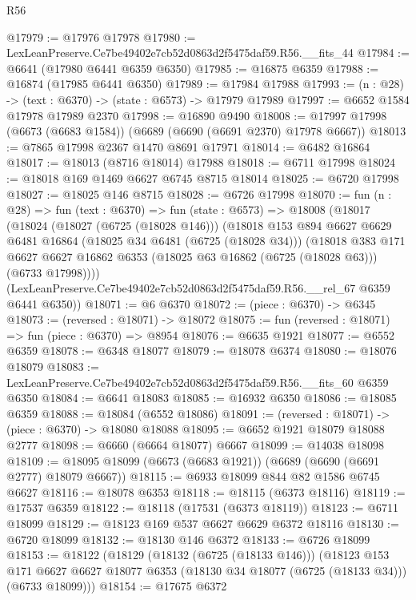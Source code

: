 \begin{lexlean}{R56}
\begin{coremodule}
@17979 := @17976 @17978
@17980 := LexLeanPreserve.Ce7be49402e7cb52d0863d2f5475daf59.R56.__fits_44
@17984 := @6641 (@17980 @6441 @6359 @6350)
@17985 := @16875 @6359
@17988 := @16874 (@17985 @6441 @6350)
@17989 := @17984 @17988
@17993 := (n : @28) -> (text : @6370) -> (state : @6573) -> @17979 @17989
@17997 := @6652 @1584 @17978 @17989 @2370
@17998 := @16890 @9490
@18008 := @17997 @17998 (@6673 (@6683 @1584)) (@6689 (@6690 (@6691 @2370) @17978 @6667))
@18013 := @7865 @17998 @2367 @1470 @8691 @17971
@18014 := @6482 @16864
@18017 := @18013 (@8716 @18014) @17988
@18018 := @6711 @17998
@18024 := @18018 @169 @1469 @6627 @6745 @8715 @18014
@18025 := @6720 @17998
@18027 := @18025 @146 @8715
@18028 := @6726 @17998
@18070 := fun (n : @28) =>
  fun (text : @6370) =>
  fun (state : @6573) =>
  @18008
    (@18017
      (@18024
        (@18027 (@6725 (@18028 @146)))
        (@18018
          @153
          @894
          @6627
          @6629
          @6481
          @16864
          (@18025 @34 @6481 (@6725 (@18028 @34)))
          (@18018
            @383
            @171
            @6627
            @6627
            @16862
            @6353
            (@18025 @63 @16862 (@6725 (@18028 @63)))
            (@6733 @17998))))
      (LexLeanPreserve.Ce7be49402e7cb52d0863d2f5475daf59.R56.__rel_67 @6359 @6441 @6350))
@18071 := @6 @6370
@18072 := (piece : @6370) -> @6345
@18073 := (reversed : @18071) -> @18072
@18075 := fun (reversed : @18071) => fun (piece : @6370) => @8954
@18076 := @6635 @1921
@18077 := @6552 @6359
@18078 := @6348 @18077
@18079 := @18078 @6374
@18080 := @18076 @18079
@18083 := LexLeanPreserve.Ce7be49402e7cb52d0863d2f5475daf59.R56.__fits_60 @6359 @6350
@18084 := @6641 @18083
@18085 := @16932 @6350
@18086 := @18085 @6359
@18088 := @18084 (@6552 @18086)
@18091 := (reversed : @18071) -> (piece : @6370) -> @18080 @18088
@18095 := @6652 @1921 @18079 @18088 @2777
@18098 := @6660 (@6664 @18077) @6667
@18099 := @14038 @18098
@18109 := @18095 @18099 (@6673 (@6683 @1921)) (@6689 (@6690 (@6691 @2777) @18079 @6667))
@18115 := @6933 @18099 @844 @82 @1586 @6745 @6627
@18116 := @18078 @6353
@18118 := @18115 (@6373 @18116)
@18119 := @17537 @6359
@18122 := @18118 (@17531 (@6373 @18119))
@18123 := @6711 @18099
@18129 := @18123 @169 @537 @6627 @6629 @6372 @18116
@18130 := @6720 @18099
@18132 := @18130 @146 @6372
@18133 := @6726 @18099
@18153 := @18122
    (@18129
      (@18132 (@6725 (@18133 @146)))
      (@18123
        @153
        @171
        @6627
        @6627
        @18077
        @6353
        (@18130 @34 @18077 (@6725 (@18133 @34)))
        (@6733 @18099)))
@18154 := @17675 @6372

\end{coremodule}
\end{lexlean}
